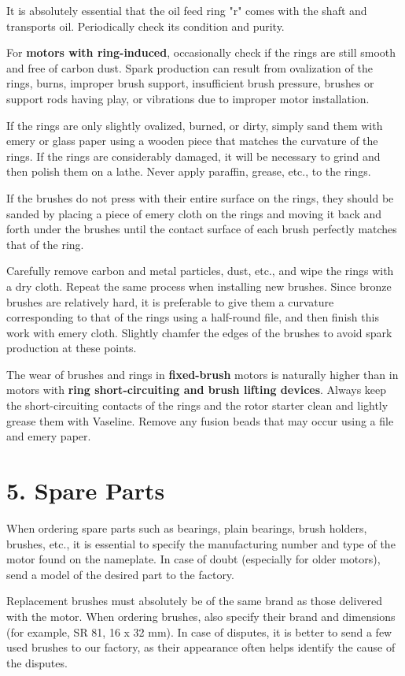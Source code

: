 {It is absolutely essential that the oil feed ring "r" comes with the shaft and transports oil. Periodically check its condition and purity.

For \textbf{motors with ring-induced}, occasionally check if the rings are still smooth and free of carbon dust. Spark production can result from ovalization of the rings, burns, improper brush support, insufficient brush pressure, brushes or support rods having play, or vibrations due to improper motor installation.

If the rings are only slightly ovalized, burned, or dirty, simply sand them with emery or glass paper using a wooden piece that matches the curvature of the rings. If the rings are considerably damaged, it will be necessary to grind and then polish them on a lathe. Never apply paraffin, grease, etc., to the rings.

If the brushes do not press with their entire surface on the rings, they should be sanded by placing a piece of emery cloth on the rings and moving it back and forth under the brushes until the contact surface of each brush perfectly matches that of the ring.

Carefully remove carbon and metal particles, dust, etc., and wipe the rings with a dry cloth. Repeat the same process when installing new brushes. Since bronze brushes are relatively hard, it is preferable to give them a curvature corresponding to that of the rings using a half-round file, and then finish this work with emery cloth. Slightly chamfer the edges of the brushes to avoid spark production at these points.

The wear of brushes and rings in \textbf{fixed-brush} motors is naturally higher than in motors with \textbf{ring short-circuiting and brush lifting devices}. Always keep the short-circuiting contacts of the rings and the rotor starter clean and lightly grease them with Vaseline. Remove any fusion beads that may occur using a file and emery paper.

\section*{5. Spare Parts}

When ordering spare parts such as bearings, plain bearings, brush holders, brushes, etc., it is essential to specify the manufacturing number and type of the motor found on the nameplate. In case of doubt (especially for older motors), send a model of the desired part to the factory.

Replacement brushes must absolutely be of the same brand as those delivered with the motor. When ordering brushes, also specify their brand and dimensions (for example, SR 81, 16 x 32 mm). In case of disputes, it is better to send a few used brushes to our factory, as their appearance often helps identify the cause of the disputes.

}